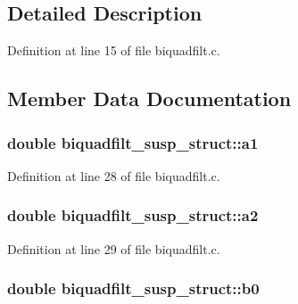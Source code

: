 \subsection{Detailed Description}


Definition at line 15 of file biquadfilt.\+c.



\subsection{Member Data Documentation}
\subsubsection[{\texorpdfstring{a1}{a1}}]{\setlength{\rightskip}{0pt plus 5cm}double biquadfilt\+\_\+susp\+\_\+struct\+::a1}\hypertarget{structbiquadfilt__susp__struct_ad902fb8ca9e800e6519c1881d687f27c}{}\label{structbiquadfilt__susp__struct_ad902fb8ca9e800e6519c1881d687f27c}


Definition at line 28 of file biquadfilt.\+c.

\subsubsection[{\texorpdfstring{a2}{a2}}]{\setlength{\rightskip}{0pt plus 5cm}double biquadfilt\+\_\+susp\+\_\+struct\+::a2}\hypertarget{structbiquadfilt__susp__struct_a3ef2e3a282a31c3667fa117e4c727254}{}\label{structbiquadfilt__susp__struct_a3ef2e3a282a31c3667fa117e4c727254}


Definition at line 29 of file biquadfilt.\+c.

\subsubsection[{\texorpdfstring{b0}{b0}}]{\setlength{\rightskip}{0pt plus 5cm}double biquadfilt\+\_\+susp\+\_\+struct\+::b0}\hypertarget{structbiquadfilt__susp__struct_a6eb12d0d781446d149cf2d8b2661e2a1}{}\label{structbiquadfilt__susp__struct_a6eb12d0d781446d149cf2d8b2661e2a1}



